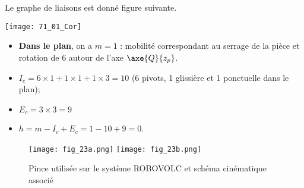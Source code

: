 \normaltrue \difficilefalse \tdifficilefalse
\correctiontrue

\setcounter{question}{0}%


\ifcorrection
\else
{}
\fi


\ifprof

Le graphe de liaisons est donné figure suivante. 

\begin{center}
\texttt{[image: 71\_01\_Cor]}
\end{center}

\begin{itemize}
\item \textbf{Dans le plan}, on a $m=1$ : mobilité correspondant au serrage de la pièce et rotation de 6 autour de l'axe $\axe{Q}{z_p}$.
\item $I_c = 6\times 1 + 1 \times 1 + 1 \times 3 = 10$ (6 pivots, 1 glissière et 1 ponctuelle dans le plan);
\item $E_c = 3 \times 3 = 9$
\item $h=m-I_c+E_c = 1-10+9 = 0$. 
\end{itemize}
\else
\fi

\ifprof
\else
\begin{figure}[H]
\centering
\texttt{[image: fig\_23a.png]}
\texttt{[image: fig\_23b.png]}
\caption{Pince utilisée sur le système ROBOVOLC et schéma cinématique associé \label{fig_23}}
\end{figure} 
\fi 

\ifprof
\else
{}

\fi